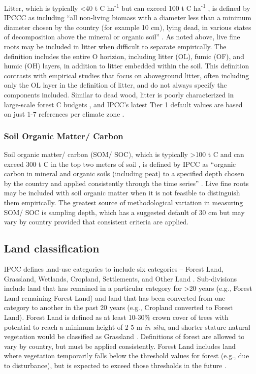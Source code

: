 \documentclass[, manuscript]{copernicus}
\begin{document}
Litter, which is typically \textless40 t C ha\textsuperscript{-1} but
can exceed 100 t C ha\textsuperscript{-1}
\citep{anderson-teixeira_carbon_2021}, is defined by IPCCC as including
``all non-living biomass with a diameter less than a minimum diameter
chosen by the country (for example 10 cm), lying dead, in various states
of decomposition above the mineral or organic soil''
\citep{ipcc_good_2003, ipcc_2006_2006}. As noted above, live fine roots
may be included in litter when difficult to separate empirically. The
definition includes the entire O horizion, including litter (OL), fumic
(OF), and humic (OH) layers, in addition to litter embedded within the
soil. This definition contrasts with empirical studies that focus on
aboveground litter, often including only the OL layer in the definition
of litter, and do not always specify the components included. Similar to
dead wood, litter is poorly characterized in large-scale forest C
budgets \citep{pan_large_2011, harris_global_2021}, and IPCC's latest
Tier 1 default values are based on just 1-7 references per climate zone
\citep[Table 2.2 in][]{ipcc_2019_2019}.

\subsubsection{Soil Organic Matter/ Carbon}

Soil organic matter/ carbon (SOM/ SOC), which is typically
\textgreater100 t C and can exceed 300 t C in the top two meters of soil
\citep{sanderman_soil_2017}, is defined by IPCC as ``organic carbon in
mineral and organic soils (including peat) to a specified depth chosen
by the country and applied consistently through the time series''
\citep{ipcc_good_2003, ipcc_2006_2006}. Live fine roots may be included
with soil organic matter when it is not feasible to distinguish them
empirically. The greatest source of methodological variation in
measuring SOM/ SOC is sampling depth, which has a suggested default of
30 cm but may vary by country provided that consistent criteria are
applied.

\subsection{Land classification}

IPCC defines land-use categories to include six categories -- Forest
Land, Grassland, Wetlands, Cropland, Settlements, and Other Land
\citep{ipcc_2006_2006}. Sub-divisions include land that has remained in
a particular category for \textgreater20 years (e.g., Forest Land
remaining Forest Land) and land that has been converted from one
category to another in the past 20 years (e.g., Cropland converted to
Forest Land). Forest Land is defined as at least 10-30\% crown cover of
trees with potential to reach a minimum height of 2-5 m \emph{in situ},
and shorter-stature natural vegetation would be classified as Grassland
\citep{ipcc_good_2003}. Definitions of forest are allowed to vary by
country, but must be applied consistently. Forest Land includes land
where vegetation temporarily falls below the threshold values for forest
(e.g., due to disturbance), but is expected to exceed those thresholds
in the future \citep{ipcc_good_2003}.
\end{document}
